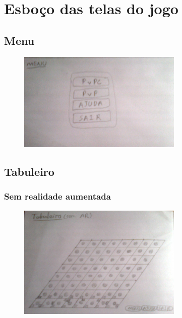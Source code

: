 \documentclass[a4paper,12pt]{article}
\begin{document}
\section{Esbo\c co das telas do jogo}
\label{sec: telas}

\subsection{Menu}
\label{subsec: menu}

\begin{figure}[h]
\centering
\includegraphics[width=0.7\textwidth]{menu}
\end{figure}

\subsection{Tabuleiro}
\label{subsec: tabuleiro}

\subsubsection{Sem realidade aumentada}
\label{subsubsec: semrealidadeaumentada}

\begin{figure}[h]
\centering
\includegraphics[width=0.7\textwidth]{tabuleirosemar}
\end{figure}
\end{document}
